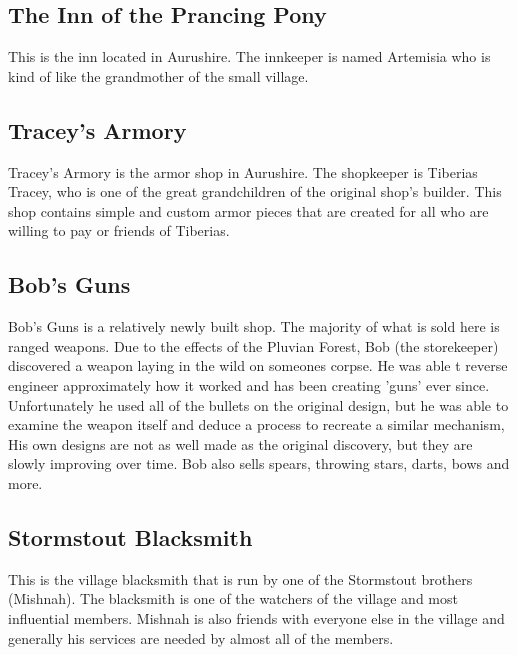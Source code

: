 \subsection{The Inn of the Prancing Pony}

This is the inn located in Aurushire. The innkeeper is named Artemisia who is kind of like the grandmother of the small village. 

\subsection{Tracey's Armory}

Tracey's Armory is the armor shop in Aurushire. The shopkeeper is Tiberias Tracey, who is one of the great grandchildren of the original shop's builder. This shop contains simple and custom armor pieces that are created for all who are willing to pay or friends of Tiberias. 

\subsection{Bob's Guns}

Bob's Guns is a relatively newly built shop. The majority of what is sold here is ranged weapons. Due to the effects of the Pluvian Forest, Bob (the storekeeper) discovered a weapon laying in the wild on someones corpse. He was able t reverse engineer approximately how it worked and has been creating 'guns' ever since. Unfortunately he used all of the bullets on the original design, but he was able to examine the weapon itself and deduce a process to recreate a similar mechanism, His own designs are not as well made as the original discovery, but they are slowly improving over time. Bob also sells spears, throwing stars, darts, bows and more.

\subsection{Stormstout Blacksmith}

This is the village blacksmith that is run by one of the Stormstout brothers (Mishnah). The blacksmith is one of the watchers of the village and most influential members. Mishnah is also friends with everyone else in the village and generally his services are needed by almost all of the members.

